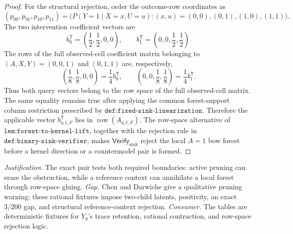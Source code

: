 \documentclass{article}
\begin{document}
\begin{proof}
For the structural rejection, order the outcome-row coordinates as
\[
 (p_{00},p_{01},p_{10},p_{11})
 =\bigl(P(Y=1\mid X=x,U=u): (x,u)=(0,0),(0,1),(1,0),(1,1)\bigr).
\]
The two intervention coefficient vectors are
\[
 b_0^{\mathsf T}=\left(\frac12,\frac12,0,0\right),
 \qquad
 b_1^{\mathsf T}=\left(0,0,\frac12,\frac12\right).
\]
The rows of the full observed-cell coefficient matrix belonging to \((A,X,Y)=(0,0,1)\) and \((0,1,1)\) are, respectively,
\[
 \left(\frac18,\frac18,0,0\right)=\frac14 b_0^{\mathsf T},
 \qquad
 \left(0,0,\frac18,\frac18\right)=\frac14 b_1^{\mathsf T}.
\]
Thus both query vectors belong to the row space of the full observed-cell matrix.  The same equality remains true after applying the common forest-support column restriction prescribed by \(\texttt{def:fixed-sink-linearization}\).  Therefore the applicable vector \(b_{\eta,t,F}^{\mathsf T}\) lies in \(\operatorname{row}(A_{\eta,t,F})\).  The row-space alternative of \(\texttt{lem:forest-to-kernel-lift}\), together with the rejection rule in \(\texttt{def:binary-sink-verifier}\), makes \(\mathsf{Verify}_{\mathrm{sink}}\) reject the local \(A=1\) bow forest before a kernel direction or a countermodel pair is formed.
\end{proof}
\par\smallskip\noindent \textit{Justification.} The exact pair tests both required boundaries: active pruning can erase the obstruction, while a reference context can annihilate a local forest through row-space gluing. \textit{Gap.} Chen and Darwiche give a qualitative pruning warning; these rational fixtures impose two-child latents, positivity, an exact \(3/200\) gap, and structural reference-context rejection. \textit{Consumer.} The tables are deterministic fixtures for \(Y_0\)'s trace retention, rational contraction, and row-space rejection logic.
\end{document}
